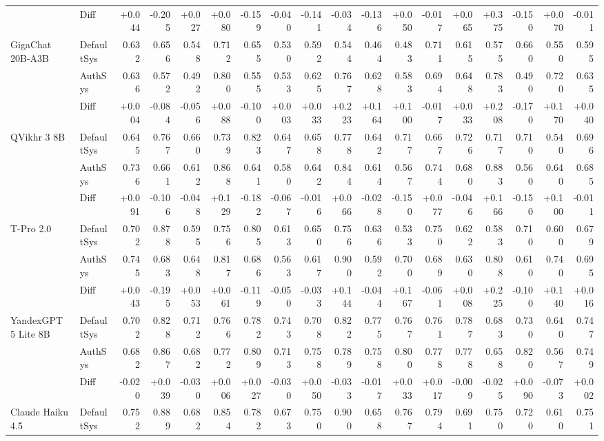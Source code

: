 \begin{table}[htbp]
{\begin{tabular}{llrrrrrrrrrrrrrrrr}
\rowcolor{Gray} & Diff & +0.044 & -0.205 & +0.027 & +0.080 & -0.159 & -0.040 & -0.141 & -0.034 & -0.136 & +0.050 & -0.017 & +0.065 & +0.375 & -0.150 & +0.070 & -0.011 \\
GigaChat 20B-A3B & DefaultSys & 0.632 & 0.656 & 0.548 & 0.712 & 0.655 & 0.530 & 0.592 & 0.544 & 0.464 & 0.483 & 0.711 & 0.615 & 0.575 & 0.660 & 0.550 & 0.595 \\
 & AuthSys & 0.636 & 0.572 & 0.492 & 0.800 & 0.555 & 0.533 & 0.625 & 0.767 & 0.628 & 0.583 & 0.694 & 0.648 & 0.783 & 0.490 & 0.720 & 0.635 \\
\rowcolor{Gray} & Diff & +0.004 & -0.084 & -0.056 & +0.088 & -0.100 & +0.003 & +0.033 & +0.223 & +0.164 & +0.100 & -0.017 & +0.033 & +0.208 & -0.170 & +0.170 & +0.040 \\
QVikhr 3 8B & DefaultSys & 0.645 & 0.767 & 0.660 & 0.739 & 0.823 & 0.647 & 0.658 & 0.778 & 0.642 & 0.717 & 0.667 & 0.726 & 0.717 & 0.710 & 0.540 & 0.696 \\
 & AuthSys & 0.736 & 0.661 & 0.612 & 0.868 & 0.641 & 0.580 & 0.642 & 0.844 & 0.614 & 0.567 & 0.744 & 0.680 & 0.883 & 0.560 & 0.640 & 0.685 \\
\rowcolor{Gray} & Diff & +0.091 & -0.106 & -0.048 & +0.129 & -0.182 & -0.067 & -0.016 & +0.066 & -0.028 & -0.150 & +0.077 & -0.046 & +0.166 & -0.150 & +0.100 & -0.011 \\
T-Pro 2.0 & DefaultSys & 0.702 & 0.878 & 0.595 & 0.756 & 0.805 & 0.613 & 0.650 & 0.756 & 0.636 & 0.533 & 0.750 & 0.622 & 0.583 & 0.710 & 0.600 & 0.679 \\
 & AuthSys & 0.745 & 0.683 & 0.648 & 0.817 & 0.686 & 0.563 & 0.617 & 0.900 & 0.592 & 0.700 & 0.689 & 0.630 & 0.808 & 0.610 & 0.740 & 0.695 \\
\rowcolor{Gray} & Diff & +0.043 & -0.195 & +0.053 & +0.061 & -0.119 & -0.050 & -0.033 & +0.144 & -0.044 & +0.167 & -0.061 & +0.008 & +0.225 & -0.100 & +0.140 & +0.016 \\
YandexGPT 5 Lite 8B & DefaultSys & 0.702 & 0.828 & 0.712 & 0.766 & 0.782 & 0.743 & 0.708 & 0.822 & 0.775 & 0.767 & 0.761 & 0.787 & 0.683 & 0.730 & 0.640 & 0.747 \\
 & AuthSys & 0.682 & 0.867 & 0.682 & 0.772 & 0.809 & 0.713 & 0.758 & 0.789 & 0.758 & 0.800 & 0.778 & 0.778 & 0.658 & 0.820 & 0.567 & 0.749 \\
\rowcolor{Gray} & Diff & -0.020 & +0.039 & -0.030 & +0.006 & +0.027 & -0.030 & +0.050 & -0.033 & -0.017 & +0.033 & +0.017 & -0.009 & -0.025 & +0.090 & -0.073 & +0.002 \\
Claude Haiku 4.5 & DefaultSys & 0.752 & 0.889 & 0.682 & 0.854 & 0.782 & 0.673 & 0.750 & 0.900 & 0.658 & 0.767 & 0.794 & 0.691 & 0.750 & 0.720 & 0.610 & 0.751 \\

\end{tabular}}
\end{table}
